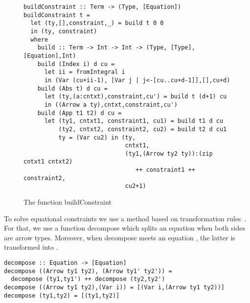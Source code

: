 \documentclass{jfp1}
\begin{document}
\begin{figure}[!btph]
  \centering
  \begin{normalsize}
\begin{verbatim}
buildConstraint :: Term -> (Type, [Equation])
buildConstraint t = 
  let (ty,[],constraint,_) = build t 0 0 
  in (ty, constraint)
  where
    build :: Term -> Int -> Int -> (Type, [Type], [Equation],Int)
    build (Index i) d cu = 
      let ii = fromIntegral i 
      in (Var (cu+ii-1), [Var j | j<-[cu..cu+d-1]],[],cu+d)
    build (Abs t) d cu = 
      let (ty,(a:cntxt),constraint,cu') = build t (d+1) cu 
      in ((Arrow a ty),cntxt,constraint,cu')
    build (App t1 t2) d cu = 
      let (ty1, cntxt1, constraint1, cu1) = build t1 d cu 
          (ty2, cntxt2, constraint2, cu2) = build t2 d cu1
          ty = (Var cu2) in (ty,
                             cntxt1,
                             (ty1,(Arrow ty2 ty)):(zip cntxt1 cntxt2) 
                                ++ constraint1 ++ constraint2, 
                             cu2+1)
\end{verbatim}
  \end{normalsize}
  \caption{The function \textsf{buildConstraint}}
\label{fig:bldcons}
\end{figure}
To solve equational constraints we use a method based on transformation
rules~\cite{GallierSnyderTCS89,JouannaudKirchner-rob91}. For that, we use a function
\textsf{decompose} which splits an equation when both sides are arrow types.
Moreover, when \textsf{decompose} meets an equation , the latter
is transformed into .

\begin{verbatim}
decompose :: Equation -> [Equation]
decompose ((Arrow ty1 ty2), (Arrow ty1' ty2')) = 
  decompose (ty1,ty1') ++ decompose (ty2,ty2')
decompose ((Arrow ty1 ty2),(Var i)) = [(Var i,(Arrow ty1 ty2))]
decompose (ty1,ty2) = [(ty1,ty2)]
\end{verbatim}
\end{document}

